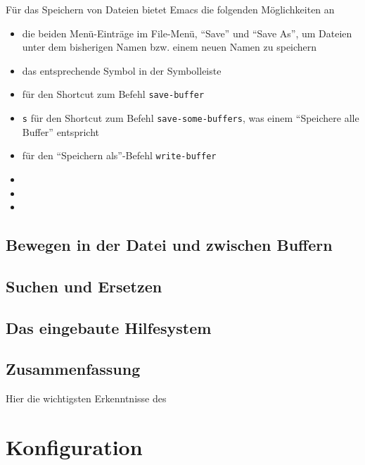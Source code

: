 \documentclass[12pt,ngerman]{scrbook}
\begin{document}
Für das Speichern von Dateien bietet Emacs die folgenden Möglichkeiten an

\begin{itemize}
	\item die beiden Menü-Einträge im File-Menü, \enquote{Save} und \enquote{Save As}, um Dateien unter dem bisherigen Namen bzw. einem neuen Namen zu speichern
	\item das entsprechende Symbol in der Symbolleiste

\item {}  für den Shortcut zum Befehl \texttt{save-buffer} 

\item {} \texttt{s} für den Shortcut zum Befehl \texttt{save-some-buffers}, was einem \enquote{Speichere alle Buffer} entspricht 
\item {}  für den \enquote{Speichern als}-Befehl \texttt{write-buffer}
\item 
\item 
\item 
\end{itemize}


\section{Bewegen in der Datei und zwischen Buffern}




\section{Suchen und Ersetzen}

\section{Das eingebaute Hilfesystem}



\section{Zusammenfassung}

Hier die wichtigsten Erkenntnisse des 


\chapter{Konfiguration}

\end{document}
